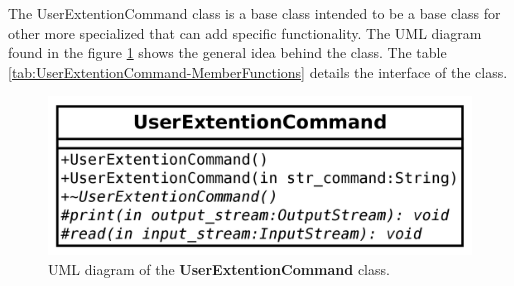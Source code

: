 \documentclass[11pt,twoside,openany,x11names,svgnames]{memoir}
\begin{document}
The UserExtentionCommand class is a base class intended to be a base class for other more specialized that can add specific functionality. The UML diagram found in the figure \ref{fig:class-userextention-command} shows the general idea behind the class. The table \ref{tab:UserExtentionCommand-MemberFunctions} details the interface of the class.

\begin{figure}
	\centering
	\includegraphics[scale=0.2, clip=true, trim= 0pt 0pt 0pt 0pt]{images/chapter03-image31}
	\caption{UML diagram of the \textbf{UserExtentionCommand} class.}
	\label{fig:class-userextention-command}
\end{figure}
\end{document}
